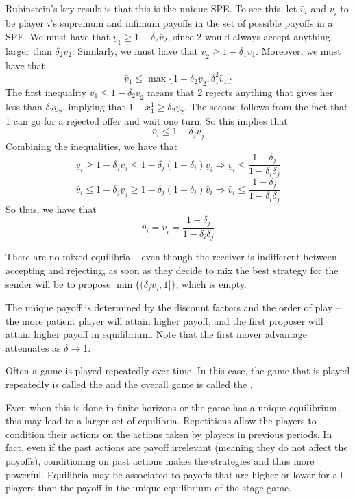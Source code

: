\documentclass[10pt]{article}
\begin{document}
\begin{model}
	Rubinstein's key result is that this is the unique SPE. To see this, let $\bar{v}_i$ and $\underline{v}_i$ to be player $i$'s supremum and infimum payoffs in the set of possible payoffs in a SPE. We must have that $\underline{v}_1 \ge 1 - \delta_2 \bar{v}_2$, since 2 would always accept anything larger than $\delta_2\bar{v}_2$. Similarly, we must have that $\underline{v}_2 \ge 1-\delta_1\bar{v}_1$. Moreover, we must have that \[\bar{v}_1 \le \max\{1-\delta_2\underline{v}_2, \delta_1^2 \bar{v}_1\}\]The first inequality $\bar{v}_1 \le 1-\delta_2 \underline{v}_2$ means that 2 rejects anything that gives her less than $\delta_2 \underline{v}_2$, implying that $1-x^1_1 \ge \delta_2 \underline{v}_2$. The second follows from the fact that 1 can go for a rejected offer and wait one turn. So this implies that \[\bar{v}_i \le 1-\delta_j \underline{v}_j\]Combining the inequalities, we have that\[\underline{v}_i \ge 1-\delta_j \bar{v}_j \le 1-\delta_j(1-\delta_i)\underline{v}_i \Longrightarrow \underline{v}_i \le \frac{1-\delta_j}{1-\delta_i\delta_j}\]\[\bar{v}_i \le 1-\delta_j \underline{v}_j \ge 1-\delta_j(1-\delta_i)\bar{v}_i \Longrightarrow \bar{v}_i \le \frac{1-\delta_j}{1-\delta_i\delta_j}\]So thus, we have that \[\bar{v}_i = \underline{v}_i = \frac{1-\delta_j}{1-\delta_i\delta_j}\]
	
	\begin{remark}
		There are no mixed equilibria -- even though the receiver is indifferent between accepting and rejecting, as soon as they decide to mix the best strategy for the sender will be to propose $\min\{(\delta_j v_j,1]\}$, which is empty.
	\end{remark}
	
	\begin{remark}
		The unique payoff is determined by the discount factors and the order of play -- the more patient player will attain higher payoff, and the first proposer will attain higher payoff in equilibrium. Note that the first mover advantage attenuates as $\delta \to 1$. 
	\end{remark}
	\end{model}


\begin{definition}
	Often a game is played repeatedly over time. In this case, the game that is played repeatedly is called the  and the overall game is called the .
\end{definition}

\begin{remark}
	Even when this is done in finite horizons or the game has a unique equilibrium, this may lead to a larger set of equilibria. Repetitions allow the players to condition their actions on the actions taken by players in previous periods. In fact, even if the past actions are payoff irrelevant (meaning they do not affect the payoffs), conditioning on past actions makes the strategies  and thus more powerful. Equilibria may be associated to payoffs that are higher or lower for all players than the payoff in the unique equilibrium of the stage game.
\end{remark}
\end{document}
